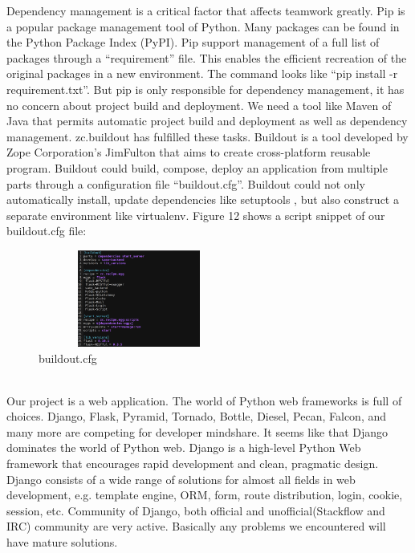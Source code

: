 \documentclass[12pt,oneside,a4paper]{article}
\begin{document}
Dependency management is a critical factor that affects teamwork greatly. Pip is a popular package management tool of Python. Many packages can be found in the Python Package Index (PyPI). Pip support management of a full list of packages through a ``requirement'' file.  This enables the efficient recreation of the original packages in a new environment. The command looks like ``pip install -r requirement.txt''. But pip is only responsible for dependency management, it has no concern about project build and deployment. We need a tool like Maven of Java that permits automatic project build and deployment as well as dependency management. zc.buildout has fulfilled these tasks. Buildout is a tool developed by Zope Corporation's JimFulton that aims to create cross-platform reusable program. Buildout could build, compose, deploy an application from multiple parts through a configuration file ``buildout.cfg''. Buildout could not only automatically install, update dependencies like setuptools , but also construct a separate environment like virtualenv. Figure 12 shows a script snippet of our buildout.cfg file:\\
\begin{figure}[htb]
\centering
\includegraphics[width=250px, height=120px]{buildout.png}
\caption{buildout.cfg}
\label{picture-label12}
\end{figure}\\
Our project is a web application. The world of Python web frameworks is full of choices. Django, Flask, Pyramid, Tornado, Bottle, Diesel, Pecan, Falcon, and many more are competing for developer mindshare. It seems like that Django dominates the world of Python web. Django is a high-level Python Web framework that encourages rapid development and clean, pragmatic design. Django consists of a wide range of solutions for almost all fields in web development, e.g. template engine, ORM, form, route distribution, login, cookie, session, etc. Community of Django, both official and unofficial(Stackflow and IRC) community are very active. Basically any problems we encountered will have mature solutions.\\\\
\end{document}
